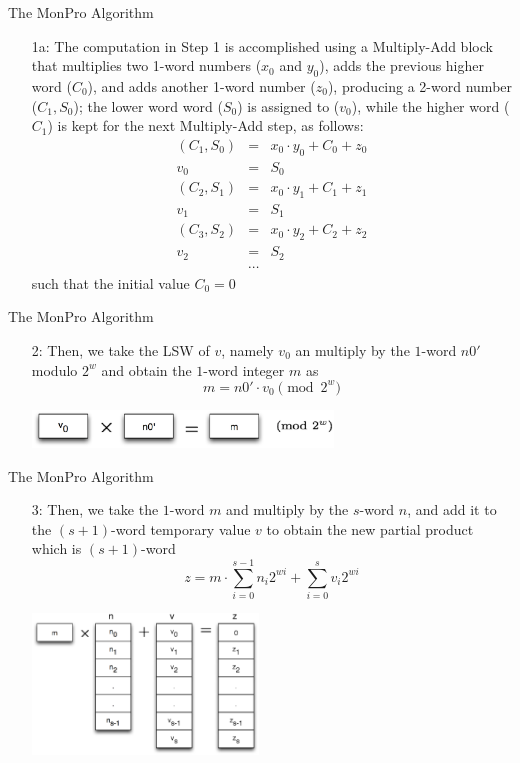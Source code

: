 \documentclass[xcolor=dvipsnames]{beamer}
\begin{document}
\begin{frame}{The MonPro Algorithm}
\begin{enumerate}

\item[1a:] The computation in Step 1 is accomplished using a Multiply-Add block
that multiplies two 1-word numbers ($x_0$ and $y_0$), adds the previous higher word ($C_0$), and adds another 1-word number ($z_0$), producing a 2-word number ($C_1,S_0$); the lower word word ($S_0$) is assigned to ($v_0$), while the higher word ($C_1$) is kept
for the next Multiply-Add step, as follows:
\begin{eqnarray*}
(C_1,S_0) & = & x_0 \cdot y_0 + C_0 + z_0 \\ 
v_0 & = & S_0 \\
(C_2,S_1) & = & x_0 \cdot y_1 + C_1 + z_1  \\
v_1 & = & S_1 \\
(C_3,S_2) & = & x_0 \cdot y_2 + C_2 + z_2 \\
v_2 & = & S_2 \\
& \cdots &
\end{eqnarray*}
such that the initial value $C_0=0$

\end{enumerate}
\end{frame}

\begin{frame}{The MonPro Algorithm}
\begin{enumerate}

\item[2:] Then, we take the LSW of $v$, namely $v_0$ an multiply by the $1$-word
$n0'$ modulo $2^{w}$ and obtain the $1$-word integer $m$ as
\[
m = n0' \cdot v_0 \pmod{2^w}
\]

\centerline{\includegraphics[width=8cm]{mp2.eps}}

\end{enumerate}
\end{frame}

\begin{frame}{The MonPro Algorithm}
\begin{enumerate}

\item[3:] Then, we take the $1$-word $m$ and multiply by the $s$-word $n$,
and add it to the $(s+1)$-word temporary value $v$ to obtain the new
partial product which is $(s+1)$-word
\[
z = m \cdot \sum_{i=0}^{s-1} n_i 2^{wi} + \sum_{i=0}^{s} v_i 2^{wi}
\]

\centerline{\includegraphics[width=6cm]{mp3.eps}}

\end{enumerate}
\end{frame}
\end{document}
